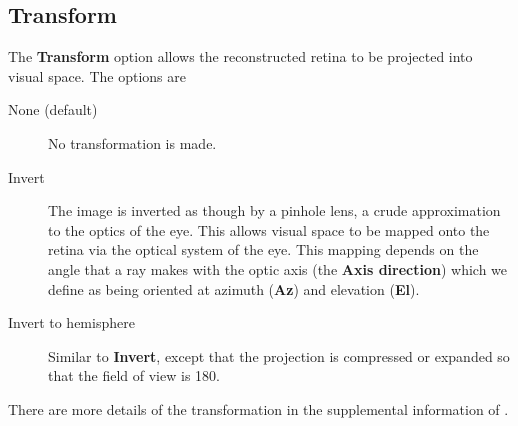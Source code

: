 \documentclass{book}
\begin{document}
\subsection{Transform}
\label{retistruct-user-guide:sec:transform}

The \textbf{Transform} option allows the reconstructed retina to be
projected into visual space. The options are

\begin{description}
\item[None (default)] No transformation is made.
\item[Invert] The image is inverted as though by a pinhole lens, a
  crude approximation to the optics of the eye. This allows visual
  space to be mapped onto the retina via the optical system of the
  eye. This mapping depends on the angle that a ray makes with the
  optic axis (the \textbf{Axis direction}) which we define as being
  oriented at azimuth (\textbf{Az}) and elevation
  (\textbf{El}). %
\item[Invert to hemisphere] Similar to \textbf{Invert}, except that
  the projection is compressed or expanded so that the field of view
  is 180\degree.
\end{description}

There are more details of the transformation in the supplemental
information of \cite{SterrattEtal2012}.


\end{document}
